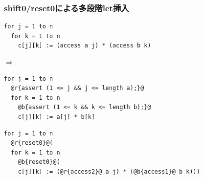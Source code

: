 \documentclass[dvipdfmx,cjk,xcolor=dvipsnames,envcountsect,notheorems,12pt]{beamer}
\theoremstyle{definition}
\begin{document}


\begin{frame}[fragile]
  \frametitle{shift0/reset0による多段階let挿入}



\begin{lstlisting}
for j = 1 to n
  for k = 1 to n
    c[j][k] := (access a j) * (access b k)
\end{lstlisting}
  \pause
  $\Rightarrow$

\begin{lstlisting}
for j = 1 to n
  @r{assert (1 <= j && j <= length a);}@
  for k = 1 to n
    @b{assert (1 <= k && k <= length b);}@
    c[j][k] := a[j] * b[k]
\end{lstlisting}
  \pause
\begin{lstlisting}
for j = 1 to n
  @r{reset0}@(
  for k = 1 to n
    @b{reset0}@(
    c[j][k] := (@r{access2}@ a j) * (@b{access1}@ b k)))
\end{lstlisting}
\end{frame}
\end{document}
